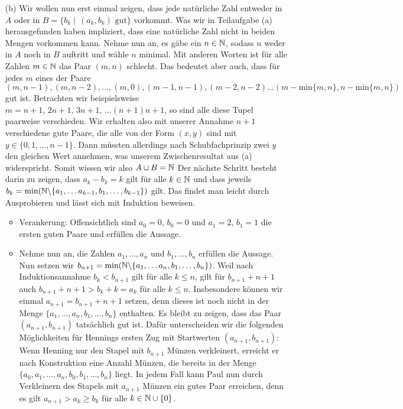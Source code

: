 \begin{enumerate}
    \item[(b)] Wir wollen nun erst einmal zeigen, dass jede natürliche Zahl entweder in $A$ oder in $B = \{b_k  \mid \, (a_k,b_k) \text{ gut} \}$ vorkommt. Was wir in Teilaufgabe (a) herausgefunden haben impliziert, dass eine natürliche Zahl nicht in beiden Mengen vorkommen kann. Nehme nun an, es gäbe ein $n \in \mathbb{N}$, sodass $n$ weder in $A$ noch in $B$ auftritt und wähle $n$ minimal. Mit anderen Worten ist für alle Zahlen $m \in \mathbb{N}$ das Paar $(m,n)$ schlecht. Das bedeutet aber auch, dass für jedes $m$ eines der Paare $(m,n-1), (m,n-2), \dots, (m,0), (m-1,n-1), (m-2,n-2) \dots (m - \text{min}\{m,n\}, n-\text{min}\{m,n\}) $ gut ist. Betrachten wir beispielsweise $m=n+1, \, 2n+1, \, 3n+1, \, \dots (n+1)n+1$, so sind alle diese Tupel paarweise verschieden. Wir erhalten also mit unserer Annahme $n+1$ verschiedene gute Paare, die alle von der Form $(x,y)$ sind mit $y \in \{0,1, \dots ,n-1\}$. Dann müssten allerdings nach Schubfachprinzip zwei $y$ den gleichen Wert annehmen, was unserem Zwischenresultat aus (a) widerspricht. Somit wissen wir also $A \sqcup B = \mathbb{N}$
    \newline
    \newline
    Der nächste Schritt besteht darin zu zeigen, dass $a_k - b_k = k$ gilt für alle $k \in \mathbb{N}$ und dass jeweils $b_k = \text{min}(\mathbb{N} \backslash \{a_1, \dots a_{k-1}, b_1, \dots, b_{k-1} \} ) $ gilt. Das findet man leicht durch Ausprobieren und lässt sich mit Induktion beweisen.
    \begin{itemize}
        \item Verankerung: Offensichtlich sind $a_0=0$, $b_0=0$ und $a_1=2$, $b_1=1$ die ersten guten Paare und erfüllen die Aussage.
        \item Nehme nun an, die Zahlen $a_1, \dots, a_n$ und $b_1, \dots, b_n$ erfüllen die Aussage. Nun setzen wir $b_{n+1} = \text{min}(\mathbb{N} \backslash \{a_1, \dots a_n, b_1, \dots, b_n \} )$. Weil nach Induktionsannahme $b_k < b_{n+1}$ gilt für alle $k \leq n$, gilt für $b_{n+1} + n+1$ auch $ b_{n+1} + n + 1 > b_k + k = a_k$ für alle $k \leq n$. Insbesondere können wir einmal $a_{n+1} = b_{n+1} + n+1$ setzen, denn dieses ist noch nicht in der Menge $\{a_1, \dots , a_n, b_1, \dots , b_n \}$ enthalten. Es bleibt zu zeigen, dass das Paar $(a_{n+1},b_{n+1})$ tatsächlich gut ist. Dafür unterscheiden wir die folgenden Möglichkeiten für Hennings ersten Zug mit Startwerten $(a_{n+1},b_{n+1})$:
        \newline
        Wenn Henning nur den Stapel mit $b_{n+1}$ Münzen verkleinert, erreicht er nach Konstruktion eine Anzahl Münzen, die bereits in der Menge $\{ a_0, a_1, \dots , a_n, b_0, b_1, \dots, b_n \}$ liegt. In jedem Fall kann Paul nun durch Verkleinern des Stapels mit $a_{n+1}$ Münzen ein gutes Paar erreichen, denn es gilt $a_{n+1} > a_k \geq b_k$ für alle $k \in \mathbb{N} \cup \{0\}$.

\end{itemize}
\end{enumerate}

